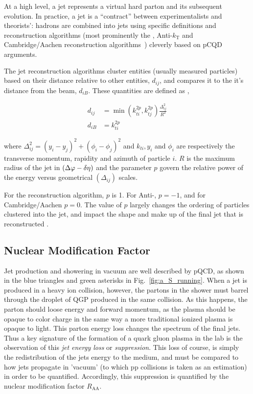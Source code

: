 At a high level, a jet represents a virtual hard parton and its subsequent evolution. In practice, a jet is a ``contract'' between experimentalists and theorists': hadrons are combined into jets using specific definitions and reconstruction algorithms (most prominently the \kt, Anti-$k_\mathrm{T}$ and Cambridge/Aachen reconstruction algorithms~\cite{Atkin2015}) cleverly based on pCQD arguments. 

The jet reconstruction algorithms cluster entities (usually measured particles) based on their distance relative to other entities, $d_{ij}$, and compares it to the it's distance from the beam, $d_{iB}$. These quantities are defined as \cite{Cacciari2008}, 

\begin{equation}
\begin{aligned}
d_{i j} &=\min \left(k_{t i}^{2 p}, k_{t j}^{2 p}\right) \frac{\Delta_{i j}^{2}}{R^{2}} \\
d_{i B} &=k_{t i}^{2 p}
\end{aligned}
\end{equation}

where $\Delta_{i j}^{2}=\left(y_{i}-y_{j}\right)^{2}+\left(\phi_{i}-\phi_{j}\right)^{2}$ and $k_{t i}, y_{i}$ and $\phi_{i}$ are respectively the transverse momentum, rapidity and azimuth of particle $i$. $R$ is the maximum radius of the jet in $(\Delta\varphi-\delta\eta)$ and the parameter $p$ govern the relative power of the energy versus geometrical $\left(\Delta_{i j}\right)$ scales.

For the \kt reconstruction algorithm, $p$ is 1. For Anti-\kt, $p=-1$, and for Cambridge/Aachen $p=0$. The value of $p$ largely changes the ordering of particles clustered into the jet, and impact the shape and make up of the final jet that is reconstructed \cite{Cacciari2008}.

\subsection{Nuclear Modification Factor}
\label{sec:raa}
Jet production and showering in vacuum are well described by pQCD, as shown in the blue triangles and green asterisks in Fig.~\ref{fig:a_S_running}. When a jet is produced in a heavy ion collision, however, the partons in the shower must barrel through the droplet of QGP produced in the same collision. As this happens, the parton should loose energy and forward momentum, as the plasma should be opaque to color charge in the same way a more traditional ionized plasma is opaque to light.  This parton energy loss changes the spectrum of the final jets. Thus a key signature of the formation of a quark gluon plasma in the lab is the observation of this \textit{jet energy loss} or \textit{suppression}. This loss of course, is simply the redistribution of the jets energy to the medium, and must be compared to how jets propagate in 'vacuum' (to which pp collisions is taken as an estimation) in order to be quantified. Accordingly, this suppression is quantified by the nuclear modification factor $R_\mathrm{AA}$. 

